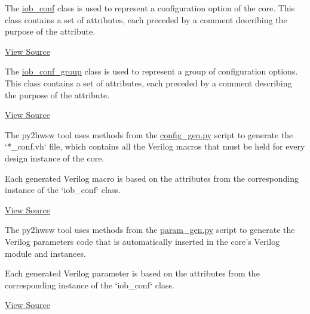 %

%
%

The \href{https://github.com/IObundle/py2hwsw/blob/main/py2hwsw/scripts/iob_conf.py}{iob\_conf} class is used to represent a configuration option of the core.
This class contains a set of attributes, each preceded by a comment describing the purpose of the attribute.


\href{https://github.com/IObundle/py2hwsw/blob/main/py2hwsw/scripts/iob_conf.py}{View Source}


The \href{https://github.com/IObundle/py2hwsw/blob/main/py2hwsw/scripts/iob_conf.py}{iob\_conf\_group} class is used to represent a group of configuration options.
This class contains a set of attributes, each preceded by a comment describing the purpose of the attribute.


\href{https://github.com/IObundle/py2hwsw/blob/main/py2hwsw/scripts/iob_conf.py}{View Source}

%
%

The py2hwsw tool uses methods from the \href{https://github.com/IObundle/py2hwsw/blob/main/py2hwsw/scripts/config_gen.py}{config\_gen.py} script to generate the `*\_conf.vh` file, which contains all the Verilog macros that must be held for every design instance of the core.

Each generated Verilog macro is based on the attributes from the corresponding instance of the `iob\_conf` class.


\href{https://github.com/IObundle/py2hwsw/blob/main/py2hwsw/scripts/config_gen.py}{View Source}


The py2hwsw tool uses methods from the \href{https://github.com/IObundle/py2hwsw/blob/main/py2hwsw/scripts/param_gen.py}{param\_gen.py} script to generate the Verilog parameters code that is automatically inserted in the core's Verilog module and instances.

Each generated Verilog parameter is based on the attributes from the corresponding instance of the `iob\_conf` class.


\href{https://github.com/IObundle/py2hwsw/blob/main/py2hwsw/scripts/param_gen.py}{View Source}

